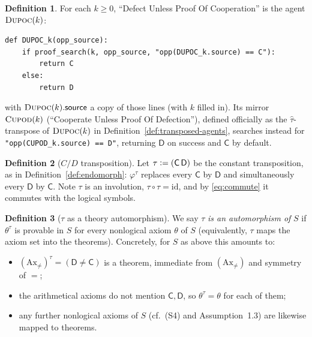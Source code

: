 \documentclass[11pt]{article}
\theoremstyle{definition}
\newtheorem{definition}{Definition}[section]
\theoremstyle{plain}
\theoremstyle{remark}
\newcommand{\Cact}{\mathsf{C}}
\newcommand{\Dact}{\mathsf{D}}
\newcommand{\tr}{\tau}
\newcommand{\defeq}{\vcentcolon=}
\begin{document}
\begin{definition}\label{def:dupoc}
For each $k\ge 0$, ``Defect Unless Proof Of Cooperation'' is the agent $\textsc{Dupoc}(k)$:
\begin{verbatim}
def DUPOC_k(opp_source):
    if proof_search(k, opp_source, "opp(DUPOC_k.source) == C"):
        return C
    else:
        return D
\end{verbatim}
with $\textsc{Dupoc}(k).\mathsf{source}$ a copy of those lines (with $k$ filled in). Its
mirror $\textsc{Cupod}(k)$ (``Cooperate Unless Proof Of Defection''), defined officially as
the $\hat{\tau}$-transpose of $\textsc{Dupoc}(k)$ in Definition~\ref{def:transposed-agents}, searches instead for
\texttt{"opp(CUPOD\_k.source) == D"}, returning $\mathsf{D}$ on success and $\mathsf{C}$ by
default.
\end{definition}









\begin{definition}[$C/D$ transposition]\label{def:tau}
Let $\tr\defeq(\Cact\,\Dact)$ be the constant transposition, as in Definition~\ref{def:endomorph}: $\varphi^{\tr}$ replaces every $\Cact$ by $\Dact$ and simultaneously every $\Dact$ by $\Cact$. Note $\tr$ is an involution, $\tr\circ\tr=\mathrm{id}$, and by \eqref{eq:commute} it commutes with the logical symbols.
\end{definition}





\begin{definition}[$\tau$ as a theory automorphism]\label{def:autohyp}
We say $\tau$ \emph{is an automorphism of} $S$ if $\theta^{\tau}$ is provable in $S$ for
every nonlogical axiom $\theta$ of $S$ (equivalently, $\tau$ maps the axiom set into the
theorems). Concretely, for $S$ as above this amounts to:
\begin{itemize}
\item[(a)] $(\mathrm{Ax}_{\neq})^{\tau}=(\mathsf{D}\neq\mathsf{C})$ is a theorem, immediate
  from $(\mathrm{Ax}_{\neq})$ and symmetry of $=$;
\item[(b)] the arithmetical axioms do not mention $\mathsf{C},\mathsf{D}$, so
  $\theta^{\tau}=\theta$ for each of them;
\item[(c)] any further nonlogical axioms of $S$ (cf.\ (S4) and Assumption~1.3) are likewise
  mapped to theorems.
\end{itemize}
\end{definition}
\end{document}
